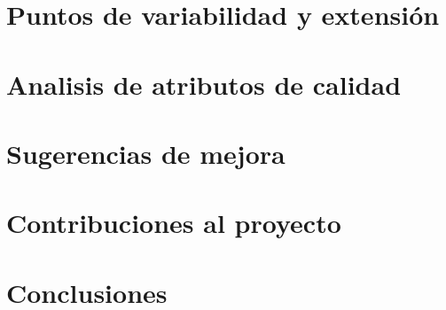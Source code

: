 \documentclass{article}
\begin{document}
\section{Puntos de variabilidad y extensión}

\section{Analisis de atributos de calidad}

\section{Sugerencias de mejora}

\section{Contribuciones al proyecto}

\section{Conclusiones}

\printbibliography
\end{document}

